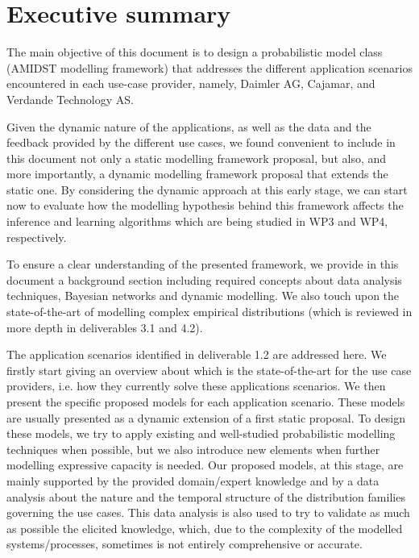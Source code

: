 \section{Executive summary}\label{section:executiveSummary}

The main objective of this document is to design a probabilistic model class (AMIDST modelling framework) that addresses the different application scenarios encountered in each use-case provider, namely, Daimler AG, Cajamar, and Verdande Technology AS.

Given the dynamic nature of the applications, as well as the data and the feedback provided by the different use cases, we found convenient to include in this document not only a static modelling framework proposal, but also, and more importantly, a dynamic modelling framework proposal that extends the static one. By considering the dynamic approach at this early stage, we can start now to evaluate how the modelling hypothesis behind this framework affects the inference and learning algorithms which are being studied in WP3 and WP4, respectively. 

To ensure a clear understanding of the presented framework, we provide in this document a background section including required concepts about data analysis techniques, Bayesian networks and dynamic modelling. We also touch upon the state-of-the-art of modelling complex empirical distributions (which is reviewed in more depth in deliverables 3.1 and 4.2).

The application scenarios identified in deliverable 1.2 are addressed here. We firstly start giving an overview about which is the state-of-the-art for the use case providers, i.e. how they currently solve these applications scenarios. We then present the specific proposed models for each application scenario. These models are usually presented as a dynamic extension of a first static proposal. To design these models, we try to apply existing and well-studied probabilistic modelling techniques when possible, but we also introduce new elements when further modelling expressive capacity is needed. Our proposed models, at this stage, are mainly supported by the provided domain/expert knowledge and by a data analysis about the nature and the temporal structure of the distribution families governing the use cases. This data analysis is also used to try to validate as much as possible the elicited knowledge, which, due to the complexity of the modelled systems/processes, sometimes is not entirely comprehensive or accurate.

